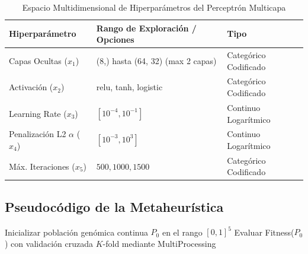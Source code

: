 \documentclass[12pt, letterpaper]{article}
\begin{document}
\begin{table}[H]
    \centering
    \caption{Espacio Multidimensional de Hiperparámetros del Perceptrón Multicapa}
    \begin{tabular}{@{}lll@{}}
        \toprule
        \textbf{Hiperparámetro} & \textbf{Rango de Exploración / Opciones} & \textbf{Tipo} \\ \midrule
        Capas Ocultas ($x_1$) & (8,) hasta (64, 32) (max 2 capas) & Categórico Codificado \\
        Activación ($x_2$) & relu, tanh, logistic & Categórico Codificado \\
        Learning Rate ($x_3$) & $[10^{-4}, 10^{-1}]$ & Continuo Logarítmico \\
        Penalización L2 $\alpha$ ($x_4$) & $[10^{-3}, 10^{3}]$ & Continuo Logarítmico \\
        Máx. Iteraciones ($x_5$) & $500, 1000, 1500$ & Categórico Codificado \\ \bottomrule
    \end{tabular}
\end{table}

\subsection{Pseudocódigo de la Metaheurística}
\begin{algorithm}[H]
\caption{Optimización Híbrida GA-GWO para MLP}
\SetAlgoLined
{}
Inicializar población genómica continua $P_{0}$ en el rango $[0, 1]^5$\;
Evaluar Fitness($P_{0}$) con validación cruzada $K$-fold mediante MultiProcessing\;
\end{algorithm}

\end{document}
